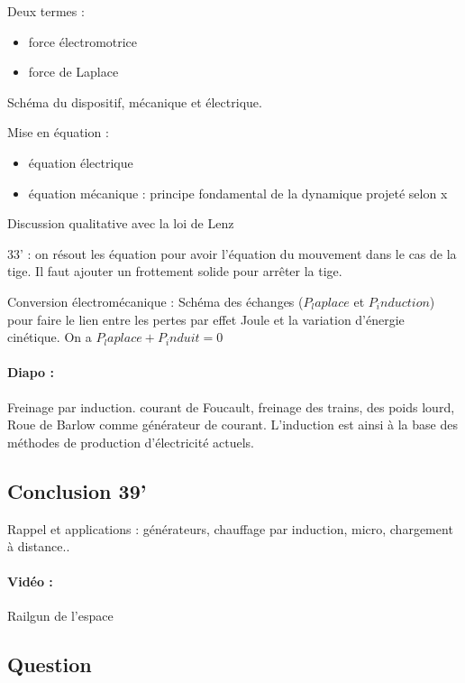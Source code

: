 Deux termes : 
\begin{itemize}
\item force électromotrice
\item force de Laplace
\end{itemize}
Schéma du dispositif, mécanique et électrique.

Mise en équation :
\begin{itemize}
\item équation électrique
\item équation mécanique : principe fondamental de la dynamique projeté selon x
\end{itemize}
Discussion qualitative avec la loi de Lenz

33' : on résout les équation pour avoir l'équation du mouvement dans le cas de la tige.
Il faut ajouter un frottement solide pour arrêter la tige.

Conversion électromécanique :
Schéma des échanges ($P_laplace$ et $P_induction$) pour faire le lien entre les pertes par effet Joule et la variation d'énergie cinétique.
On a $P_laplace + P_induit = 0$

\paragraph{Diapo :} Freinage par induction. courant de Foucault, freinage des trains, des poids lourd, Roue de Barlow comme générateur de courant. L'induction est ainsi à la base des méthodes de production d'électricité actuels.


\subsection{Conclusion 39'}

Rappel et applications : générateurs, chauffage par induction, micro, chargement à distance..

\paragraph{Vidéo :} Railgun de l'espace

\subsection{Question}

